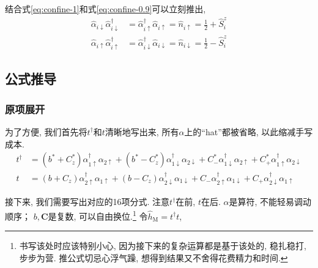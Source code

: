 \documentclass[a4paper, 12pt]{article}
\begin{document}
结合式\eqref{eq:confine-1}和式\eqref{eq:confine-0.9}可以立刻推出,
\begin{subequations}
  \label{eq:confine-2}
  \begin{align}
    \widehat{\alpha}_{i\downarrow}\widehat{\alpha}_{i\downarrow}^\dagger &= \widehat{\alpha}^\dagger_{i\uparrow}\widehat{\alpha}_{i\uparrow} = \widehat{n}_{i\uparrow} = \frac{1}{2} + \widehat{S}_i^z\\
    \widehat{\alpha}_{i\uparrow}\widehat{\alpha}_{i\uparrow}^\dagger &= \widehat{\alpha}^\dagger_{i\downarrow}\widehat{\alpha}_{i\downarrow} = \widehat{n}_{i\downarrow} = \frac{1}{2} - \widehat{S}_i^z
  \end{align}
\end{subequations}

\subsection{公式推导}
\subsubsection{原项展开}
为了方便, 我们首先将\(t^{\dagger}\)和\(t\)清晰地写出来, 所有\(\alpha\)上的``hat''都被省略, 以此缩减手写成本. 
\begin{subequations}
  \begin{align}
    t^\dagger &= (b^*+C^*_z)\alpha_{1\uparrow}^{\dagger}\alpha_{2\uparrow} + (b^*-C^*_z)\alpha_{1\downarrow}^{\dagger}\alpha_{2\downarrow} + C^*_{-}\alpha_{1\downarrow}^{\dagger}\alpha_{2\uparrow} + C^*_{+}\alpha_{1\uparrow}^{\dagger}\alpha_{2\downarrow}\\
    t &= (b+C_z)\alpha_{2\uparrow}^{\dagger}\alpha_{1\uparrow} + (b-C_z)\alpha_{2\downarrow}^{\dagger}\alpha_{1\downarrow} + C_{-}\alpha_{2\uparrow}^{\dagger}\alpha_{1\downarrow} + C_{+}\alpha_{2\downarrow}^{\dagger}\alpha_{1\uparrow}
  \end{align}
\end{subequations}

接下来, 我们需要写出对应的16项分式. 注意\(t^\dagger\)在前, \(t\)在后. \(\alpha\)是算符, 不能轻易调动顺序； \(b, \bm{C}\)是复数, 可以自由换位.\footnote{书写该处时应该特别小心, 因为接下来的复杂运算都是基于该处的, 稳扎稳打, 步步为营. 推公式切忌心浮气躁, 想得到结果又不舍得花费精力和时间.} 令\(\widehat{h}_{\text{M}} = t^\dagger{}t\),
\end{document}
